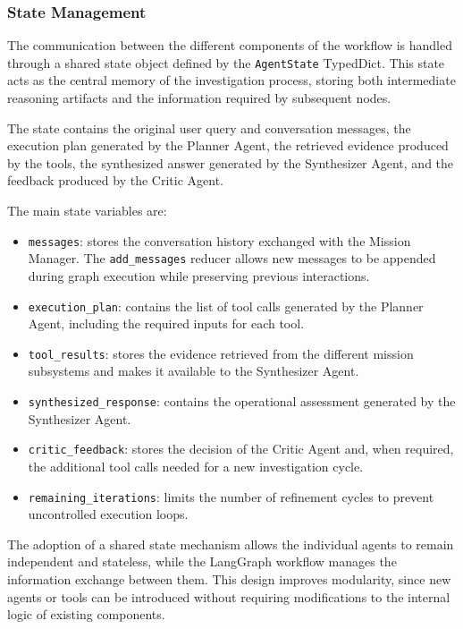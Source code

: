 \subsubsection{State Management}
\label{sec: state management}

The communication between the different components of the workflow is handled through a shared state object defined by the \texttt{AgentState} TypedDict. This state acts as the central memory of the investigation process, storing both intermediate reasoning artifacts and the information required by subsequent nodes.

The state contains the original user query and conversation messages, the execution plan generated by the Planner Agent, the retrieved evidence produced by the tools, the synthesized answer generated by the Synthesizer Agent, and the feedback produced by the Critic Agent.

The main state variables are:

\begin{itemize}
    \item \texttt{messages}: stores the conversation history exchanged with the Mission Manager. The \texttt{add\_messages} reducer allows new messages to be appended during graph execution while preserving previous interactions.
    
    \item \texttt{execution\_plan}: contains the list of tool calls generated by the Planner Agent, including the required inputs for each tool.
    
    \item \texttt{tool\_results}: stores the evidence retrieved from the different mission subsystems and makes it available to the Synthesizer Agent.
    
    \item \texttt{synthesized\_response}: contains the operational assessment generated by the Synthesizer Agent.
    
    \item \texttt{critic\_feedback}: stores the decision of the Critic Agent and, when required, the additional tool calls needed for a new investigation cycle.
    
    \item \texttt{remaining\_iterations}: limits the number of refinement cycles to prevent uncontrolled execution loops.
\end{itemize}

The adoption of a shared state mechanism allows the individual agents to remain independent and stateless, while the LangGraph workflow manages the information exchange between them. This design improves modularity, since new agents or tools can be introduced without requiring modifications to the internal logic of existing components.

